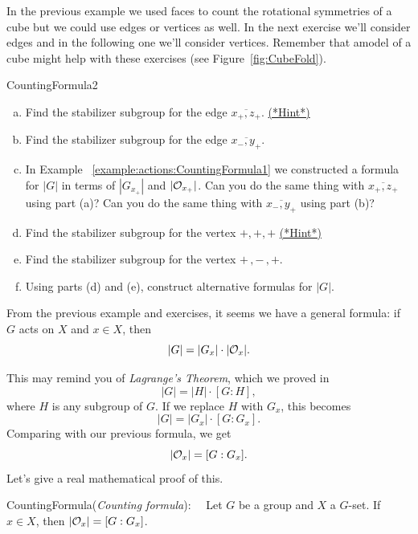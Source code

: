 In the previous example we used faces to count the rotational symmetries of a cube but we could use edges or vertices as well.  In the next exercise we'll consider edges and in the following one we'll consider vertices.   Remember that amodel of a cube might help with these exercises (see Figure~\ref{fig:CubeFold}).

\begin{exercise}{CountingFormula2}
\begin{enumerate}[(a)]
\item Find the stabilizer subgroup for the edge $\overline{x_+,z_+}$. 
\hyperref[sec:actions:hints]{(*Hint*)}
\item Find the stabilizer subgroup for the edge $\overline{x_-,y_+}$.
\item In Example ~\ref {example:actions:CountingFormula1} we constructed a formula for $|G|$ in terms of $| G_{x_+}|$ and $|{\cal O}_{x_+}|$.  Can you do the same thing with $\overline{x_+,z_+}$ using part (a)?  Can you do the same thing with $\overline{x_-,y_+}$ using part (b)?  
\item Find the stabilizer subgroup for the vertex $+,+,+$ 
\hyperref[sec:actions:hints]{(*Hint*)}
\item Find the stabilizer subgroup for the vertex $+\,,-\,,+$. 
\item Using parts (d) and (e), construct alternative formulas for $|G|$.
\end{enumerate}
\end{exercise}

From the previous example and exercises, it seems we have a general formula:  if $G$ acts on $X$ and $x\in X$, then 
$$|G|=|G_x|\cdot|{\cal O}_x|.$$

This may remind you of \emph{Lagrange's Theorem}, which we proved in %
$$|G|=|H|\cdot [G:H], $$
where $H$ is any subgroup of $G$.  If we replace $H$ with $G_x$, this becomes $$|G|=|G_x|\cdot [G:G_x]. $$
Comparing with our previous formula, we get
 $$|{\cal O}_x|=[G:G_x].$$
Let's give a real mathematical proof of this.

\begin{prop}{CountingFormula}(\emph{Counting formula}):~~
Let $G$ be a group and $X$ a $G$-set. If $x\in X$,
then $|{\cal O}_x| = [G:G_x]$. 
\end{prop}

